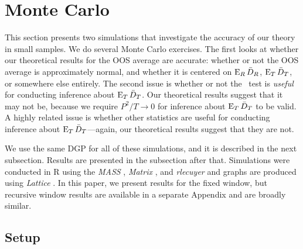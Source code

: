\documentclass[12pt]{article}
\begin{document}
\section{Monte Carlo}
\label{sec:mc}

This section presents two simulations that investigate the accuracy of
our theory in small samples.
We do several Monte Carlo exercises. The first looks at whether our
theoretical results for the OOS average are accurate: whether or not
the OOS average is approximately normal, and whether it is centered on
$\operatorname{E}_R \bar{D}_{R}$, $\operatorname{E}_T \bar{D}_{T}$, or somewhere else entirely. The second
issue is whether or not the \oost\ test is \emph{useful} for
conducting inference about $\operatorname{E}_T \bar{D}_{T}$. Our theoretical results
suggest that it may not be, because we require $P^2/T \to 0$ for
inference about $\operatorname{E}_T \bar{D}_{T}$ to be valid. A highly related issue is
whether other statistics are useful for conducting inference about
$\operatorname{E}_T \bar{D}_{T}$---again, our theoretical results suggest that they are
not.

We use the same DGP for all of these simulations, and it is described
in the next subsection. Results are presented in the subsection after
that. Simulations were conducted in R \citep{Rde:10} using the
\emph{MASS} \citep{VeR:02}, \emph{Matrix} \citep{BM:13}, and
\emph{rlecuyer} \citep{SR:12} and graphs are produced using
\emph{Lattice} \citep{Sar:10}. In this paper, we present results for
the fixed window, but recursive window results are available in a
separate Appendix and are broadly similar.

\subsection{Setup}
\label{sec:simulation-design}
\end{document}
